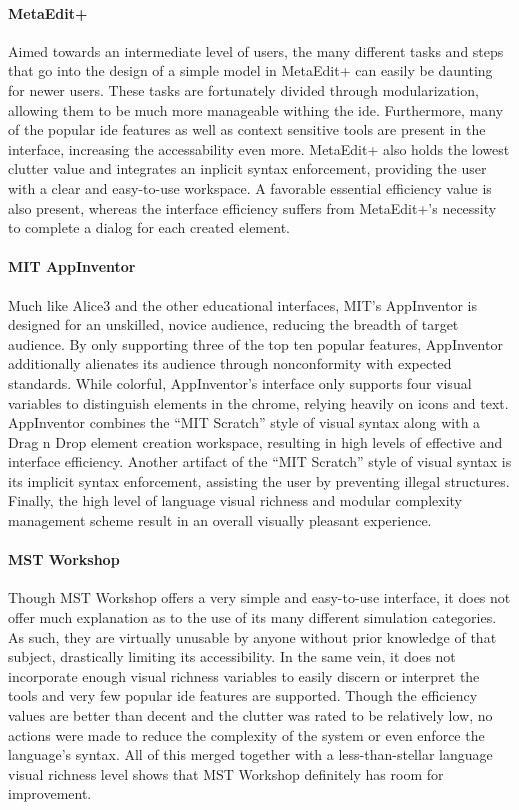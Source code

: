 \paragraph{MetaEdit+} Aimed towards an intermediate level of users, the
many different tasks and steps that go into the design of a simple model in
MetaEdit+ can easily be daunting for newer users.  These tasks are
fortunately divided through modularization, allowing them to be much more
manageable withing the \ac{ide}. Furthermore, many of the popular \ac{ide}
features as well as context sensitive tools are present in the interface,
increasing the accessability even more. MetaEdit+ also holds the lowest
clutter value and integrates an inplicit syntax enforcement, providing the
user with a clear and easy-to-use workspace. A favorable essential
efficiency value is also present, whereas the interface efficiency suffers
from MetaEdit+'s necessity to complete a dialog for each created element.

\paragraph{MIT AppInventor} Much like Alice3 and the other educational
interfaces, MIT's AppInventor is designed for an unskilled, novice
audience, reducing the breadth of target audience. By only supporting three
of the top ten popular features, AppInventor additionally alienates its
audience through nonconformity with expected standards. While colorful,
AppInventor's interface only supports four visual variables to distinguish
elements in the chrome, relying heavily on icons and text. AppInventor
combines the ``MIT Scratch'' style of visual syntax along with a Drag n
Drop element creation workspace, resulting in high levels of effective and
interface efficiency. Another artifact of the ``MIT Scratch'' style of
visual syntax is its implicit syntax enforcement, assisting the user by
preventing illegal structures. Finally, the high level of language visual
richness and modular complexity management scheme result in an overall
visually pleasant experience.

\paragraph{MST Workshop} Though MST Workshop offers a very simple and
easy-to-use interface, it does not offer much explanation as to the use of
its many different simulation categories. As such, they are virtually
unusable by anyone without prior knowledge of that subject, drastically
limiting its accessibility. In the same vein, it does not incorporate
enough visual richness variables to easily discern or interpret the tools
and very few popular \ac{ide} features are supported. Though the efficiency
values are better than decent and the clutter was rated to be relatively
low, no actions were made to reduce the complexity of the system or even
enforce the language's syntax. All of this merged together with a
less-than-stellar language visual richness level shows that MST Workshop
definitely has room for improvement.

